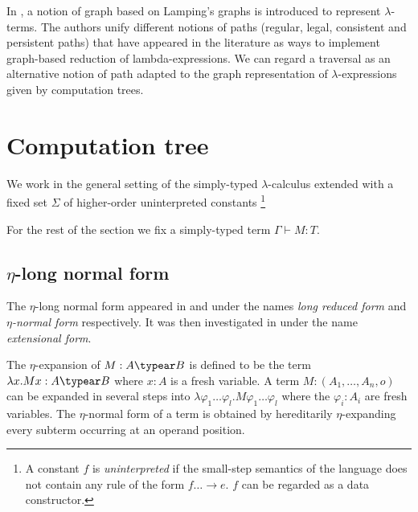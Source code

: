 In \cite{DBLP:conf/lics/AspertiDLR94}, a notion of graph based on
Lamping's graphs \citep{lamping} is introduced to represent
$\lambda$-terms. The authors unify different notions of paths
(regular, legal, consistent and persistent paths) that have appeared
in the literature as ways to implement graph-based reduction of
lambda-expressions. We can regard a traversal as an alternative
notion of path adapted to the graph representation of
$\lambda$-expressions given by computation trees.



%

\section{Computation tree}
We work in the general setting of the simply-typed
$\lambda$-calculus extended with a fixed set $\Sigma$ of
higher-order uninterpreted constants \footnote{A constant $f$ is
  \emph{uninterpreted} if the small-step semantics of the language
  does not contain any rule of the form $f \dots \rightarrow e$. $f$
  can be regarded as a data constructor.}

For the rest of the section we fix a simply-typed term $\Gamma \vdash M :T$.

\subsection{$\eta$-long normal form}

The $\eta$-long normal form appeared in
\citep{DBLP:journals/tcs/JensenP76} and
\citep{DBLP:journals/tcs/Huet75} under the names \emph{long reduced
form} and \emph{$\eta$-normal form} respectively. It was then
investigated in \citep{huet76} under the name \emph{extensional
form}.

The $\eta$-expansion of $M: A\typear B$ is defined to be the term
$\lambda x . M x : A\typear B$ where $x:A$ is a fresh variable. A
term $M : (A_1,\ldots,A_n,o)$ can be expanded in several steps into
$\lambda \varphi_1 \ldots \varphi_l . M \varphi_1 \ldots \varphi_l$
where the $\varphi_i:A_i$ are fresh variables. The $\eta$-normal
form of a term is obtained by hereditarily $\eta$-expanding every
subterm occurring at an operand position.


